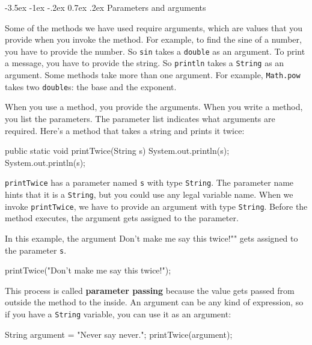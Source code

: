 \documentclass[12pt]{book}
\makeatletter
\theoremstyle{exercise}
\newcommand{\java}[1]{\verb"#1"}
\renewcommand{\section}{\@startsection{section}{1}{\z@}%
    {-3.5ex \@plus -1ex \@minus -.2ex}%
    {0.7ex \@plus.2ex}%
    {\normalfont\Large\bfseries}}
\newcommand{\java}[1]{\lstinline{#1}} %
\makeatother
\begin{document}
\section{Parameters and arguments}


Some of the methods we have used require arguments, which are values that you provide when you invoke the method.
For example, to find the sine of a number, you have to provide the number.
So \java{sin} takes a \java{double} as an argument.
To print a message, you have to provide the string.
So \java{println} takes a \java{String} as an argument.
Some methods take more than one argument.
For example, \java{Math.pow} takes two \java{double}s: the base and the exponent.

When you use a method, you provide the arguments.
When you write a method, you list the parameters.
The parameter list indicates what arguments are required.
Here's a method that takes a string and prints it twice:

\begin{code}
    public static void printTwice(String s) {
        System.out.println(s);
        System.out.println(s);
    }
\end{code}

\java{printTwice} has a parameter named \java{s} with type \java{String}.
The parameter name hints that it is a \java{String}, but you could use any legal variable name.
When we invoke \java{printTwice}, we have to provide an argument with type \java{String}.
Before the method executes, the argument gets assigned to the parameter.

In this example, the argument \java{"Don't make me say this twice!"} gets assigned to the parameter \java{s}.

\begin{code}
    printTwice("Don't make me say this twice!");
\end{code}


This process is called {\bf parameter passing} because the value gets passed from outside the method to the inside.
An argument can be any kind of expression, so if you have a \java{String} variable, you can use it as an argument:

\begin{code}
    String argument = "Never say never.";
    printTwice(argument);
\end{code}
\end{document}
